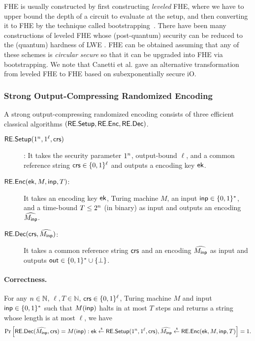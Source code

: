 FHE is usually constructed by first constructing \textit{leveled} FHE, where we have to upper bound the depth of a circuit to evaluate at the setup, and then converting it to FHE by the technique called bootstrapping~\cite{STOC:Gentry09}. 
There have been many constructions of leveled FHE whose (post-quantum) security can be reduced to the (quantum) hardness of LWE \cite{FOCS:BraVai11,ITCS:BraGenVai12,C:Brakerski12,C:GenSahWat13}.
FHE can be obtained assuming that any of these schemes is \textit{circular secure} \cite{EC:CamLys01} so that it can be upgraded into FHE via bootstrapping.
We note that Canetti et al. \cite{TCC:CLTV15} gave an alternative transformation from leveled FHE to FHE based on subexponentially secure iO.




\subsubsection{Strong Output-Compressing Randomized Encoding}
A strong output-compressing randomized encoding \cite{AC:BFKSW19} consists of three efficient classical  algorithms $(\mathsf{RE}.\mathsf{Setup},\mathsf{RE}.\mathsf{Enc},\mathsf{RE}.\mathsf{Dec})$.
\begin{description}
\item[$\mathsf{RE}.\mathsf{Setup}(1^n,1^\ell,\mathsf{crs})$]: It takes the security parameter $1^n$, output-bound $\ell$, and a common reference string $\mathsf{crs}\in\{0,1\}^{\ell}$ and outputs a encoding key $\mathsf{ek}$. 
\item[$\mathsf{RE}.\mathsf{Enc}(\mathsf{ek},M,\mathsf{inp},T)$:] It takes an encoding key $\mathsf{ek}$, Turing machine $M$, an input $\mathsf{inp}\in \{0,1\}^*$, and a time-bound $T\leq 2^{n}$ (in binary) as input and outputs an encoding $\widehat{M_{\mathsf{inp}}}$.
\item[$\mathsf{RE}.\mathsf{Dec}(\mathsf{crs},\widehat{M_{\mathsf{inp}}})$:] It takes a common reference string $\mathsf{crs}$ and an encoding $\widehat{M_{\mathsf{inp}}}$ as input and outputs $\mathsf{out} \in \{0,1\}^* \cup \{\bot\}$.
\end{description}

\paragraph{Correctness.}
For any $n\in\mathbb{N}$, $\ell,T\in \mathbb{N}$, $\mathsf{crs}\in \{0,1\}^{\ell}$, Turing machine $M$ and input $\mathsf{inp}\in \{0,1\}^*$ such that $M(\mathsf{inp})$ halts in at most $T$ steps and returns a string whose length is at most $\ell$, we have 
\begin{align*}
    \Pr\left[\mathsf{RE}.\mathsf{Dec}(\widehat{M_{\mathsf{inp}}},\mathsf{crs})=M(\mathsf{inp}): \mathsf{ek}\overset{\hspace{0.1em}\mathsf{\scriptscriptstyle\$}}{\leftarrow}\mathsf{RE}.\mathsf{Setup}(1^n,1^\ell,\mathsf{crs}), \widehat{M_{\mathsf{inp}}}\overset{\hspace{0.1em}\mathsf{\scriptscriptstyle\$}}{\leftarrow}\mathsf{RE}.\mathsf{Enc}(\mathsf{ek},M,\mathsf{inp},T)\right]=1.
\end{align*}

